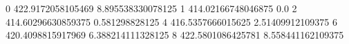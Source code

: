 0 422.9172058105469 8.895538330078125
1 414.02166748046875 0.0
2 414.60296630859375 0.581298828125
4 416.5357666015625 2.51409912109375
6 420.4098815917969 6.388214111328125
8 422.5801086425781 8.558441162109375
